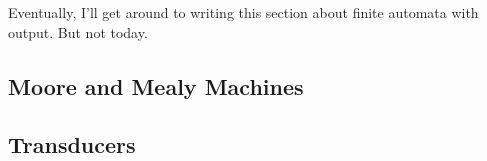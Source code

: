 \label{sec:finiteautomatawithoutput}

\begin{construction}
Eventually, I'll get around to writing this section about finite automata with output. But not today.
\end{construction}

\subsection{Moore and Mealy Machines}

\subsection{Transducers}